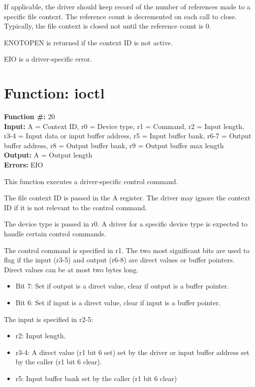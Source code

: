 If applicable, the driver should keep record of the number of references made to a specific
file context. The reference count is decremented on each call to close. Typically, the file
context is closed not until the reference count is 0.

ENOTOPEN is returned if the context ID is not active.

EIO is a driver-specific error.


\section{Function: ioctl}

\textbf{Function \#:} 20 \\
\textbf{Input:} A = Context ID, r0 = Device type, r1 = Command, r2 = Input length, r3-4 = Input data or input buffer address, r5 = Input buffer bank,
r6-7 = Output buffer address, r8 = Output buffer bank, r9 = Output buffer max length \\
\textbf{Output:} A = Output length \\
\textbf{Errors:} EIO

This function executes a driver-specific control command.

The file context ID is passed in the A register. The driver may ignore the context ID if it is not relevant
to the control command.

The device type is passed in r0. A driver for a specific device type is expected to
handle certain control commands.

The control command is specified in r1. The two most significant bits are used to flag if the input 
(r3-5) and output (r6-8) are direct values or buffer pointers. Direct values can be at most two bytes long.

\begin{itemize}
    \item Bit 7: Set if output is a direct value, clear if output is a buffer pointer.
    \item Bit 6: Set if input is a direct value, clear if input is a buffer pointer.
\end{itemize}

The input is specified in r2-5:

\begin{itemize}
    \item r2: Input length.
    \item r3-4: A direct value (r1 bit 6 set) set by the driver or input buffer address set by the caller (r1 bit 6 clear).
    \item r5: Input buffer bank set by the caller (r1 bit 6 clear)
\end{itemize}


